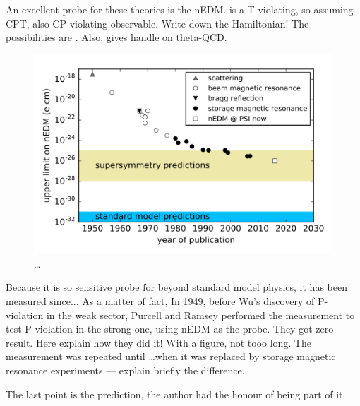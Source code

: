 An excellent probe for these theories is the nEDM. is a T-violating, so assuming CPT, also CP-violating observable. Write down the Hamiltonian!
The possibilities are \cite{Ellis1989}.
Also, gives handle on theta-QCD.

\begin{figure}
  \centering
  \includegraphics[width=\linewidth]{gfx/introduction/limits.png}
  \caption{\ldots {}  }
  \label{fig:nEDM_limits_history}
\end{figure}

Because it is so sensitive probe for beyond standard model physics, it has been measured since... As a matter of fact, In 1949, before Wu's discovery of P-violation in the weak sector, Purcell and Ramsey performed the measurement to test P-violation in the strong one, using nEDM as the probe. They got zero result. Here explain how they did it! With a figure, not tooo long. The measurement was repeated until \ldots when it was replaced by storage magnetic resonance experiments --- explain briefly the difference.

The last point is the prediction, the author had the honour of being part of it.

